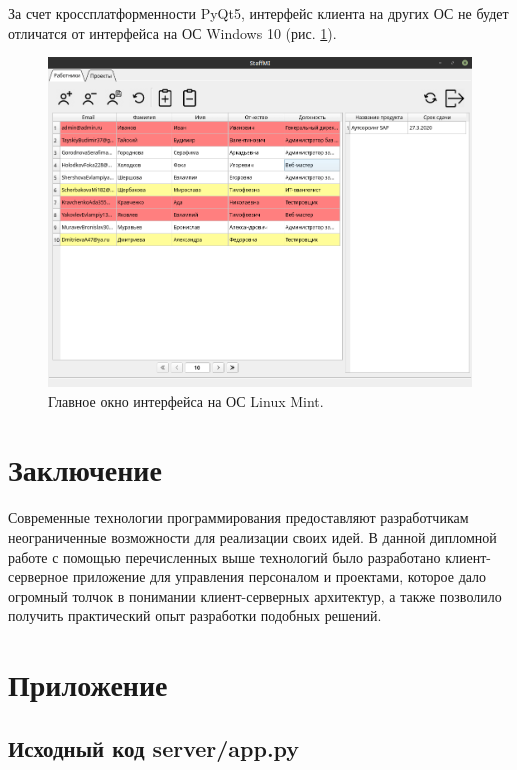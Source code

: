 За счет кроссплатформенности PyQt5, интерфейс клиента на других ОС не будет отличатся от интерфейса на ОС Windows 10 (рис. \ref{fig:main_window_linux}).

\begin{figure}[h]
    \centering
    \includegraphics[width=1\linewidth]{img/main_window_linux.png}
    \caption{Главное окно интерфейса на ОС Linux Mint.}
    \label{fig:main_window_linux}
\end{figure}


\clearpage
\section{Заключение}
Современные технологии программирования предоставляют разработчикам неограниченные возможности для реализации своих идей. В данной дипломной работе с помощью перечисленных выше технологий было разработано клиент-серверное приложение для управления персоналом и проектами, которое дало огромный толчок в понимании клиент-серверных архитектур, а также позволило получить практический опыт разработки подобных решений.


\clearpage
\section{Приложение}
\subsection{Исходный код server/app.py}



